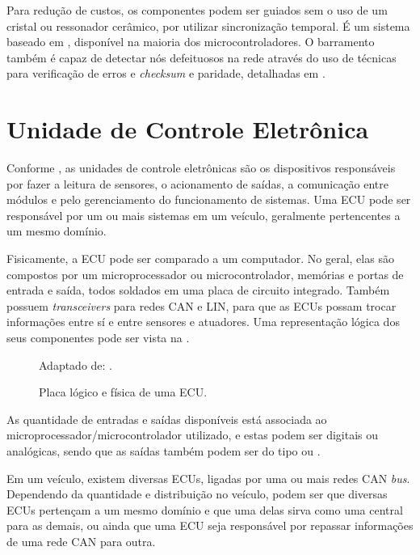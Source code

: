 Para redução de custos, os componentes podem ser guiados sem o uso de um cristal ou ressonador cerâmico, por utilizar sincronização temporal. É um sistema baseado em , disponível na maioria dos microcontroladores. O barramento também é capaz de detectar nós defeituosos na rede através do uso de técnicas para verificação de erros e \emph{checksum} e paridade, detalhadas em .

\section{Unidade de Controle Eletrônica}
\label{cap:ecu}

Conforme , as unidades de controle eletrônicas são os dispositivos responsáveis por fazer a leitura de sensores, o acionamento de saídas, a comunicação entre módulos e pelo gerenciamento do funcionamento de sistemas. Uma ECU pode ser responsável por um ou mais sistemas em um veículo, geralmente pertencentes a um mesmo domínio.

Fisicamente, a ECU pode ser comparado a um computador. No geral, elas são compostos por um microprocessador ou microcontrolador, memórias e portas de entrada e saída, todos soldados em uma placa de circuito integrado. Também possuem \emph{transceivers} para redes CAN e LIN, para que as ECUs possam trocar informações entre sí e entre sensores e atuadores. Uma representação lógica dos seus componentes pode ser vista na .

\begin{figure}[htb]
	\centering
	\caption{Placa lógico e física de uma ECU.}
	Adaptado de: .
	\label{fig:cap2_ecu_image}
\end{figure}

As quantidade de entradas e saídas disponíveis está associada ao microprocessador/microcontrolador utilizado, e estas podem ser digitais ou analógicas, sendo que as saídas também podem ser do tipo  ou .

Em um veículo, existem diversas ECUs, ligadas por uma ou mais redes CAN \emph{bus}. Dependendo da quantidade e distribuição no veículo, podem ser que diversas ECUs pertençam a um mesmo domínio e que uma delas sirva como uma central para as demais, ou ainda que uma ECU seja responsável por repassar informações de uma rede CAN para outra.


